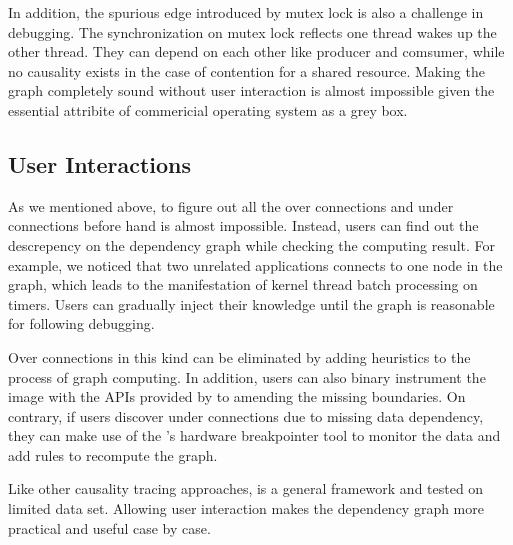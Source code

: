 In addition, the spurious edge introduced by mutex lock is also a challenge in
debugging. The synchronization on mutex lock reflects one thread wakes up the
other thread. They can depend on each other like producer and comsumer, while
no causality exists in the case of contention for a shared resource. Making the
graph completely sound without user interaction is almost impossible given the
essential attribite of commericial operating system as a grey box.

\subsection{User Interactions}


As we mentioned above, to figure out all the over connections and under
connections before hand is almost impossible. Instead, users can find out the
descrepency on the dependency graph while checking the computing result. For
example, we noticed that two unrelated applications connects to one node in the
graph, which leads to the manifestation of kernel thread batch processing on
timers. Users can gradually inject their knowledge until the graph is reasonable
for following debugging. 

Over connections in this kind can be eliminated by adding heuristics to the
process of graph computing. In addition, users can also binary instrument the
image with the APIs provided by \xxx to amending the missing boundaries. On
contrary, if users discover under connections due to missing data dependency,
they can make use of the \xxx's hardware breakpointer tool to monitor the data
and add rules to recompute the graph.

Like other causality tracing approaches, \xxx is a general framework and tested
on limited data set. Allowing user interaction makes the dependency graph more
practical and useful case by case.

